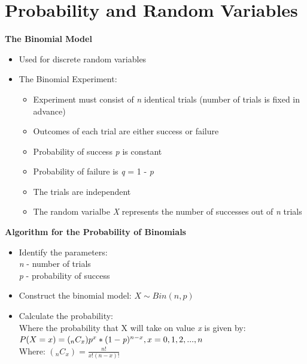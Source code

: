 \documentclass{article}
\begin{document}
\section{Probability and Random Variables}

\textbf{The Binomial Model}
\begin{itemize}
    \item Used for discrete random variables
    \item The Binomial Experiment:
    \begin{itemize}
        \item Experiment must consist of \emph{n} identical trials (number of trials is fixed in advance)
        \item Outcomes of each trial are either success or failure
        \item Probability of success \emph{p} is constant
        \item Probability of failure is \emph{q} = 1 - \emph{p}
        \item The trials are independent
        \item The random varialbe \emph{X} represents the number of successes out of \emph{n} trials 
    \end{itemize}
\end{itemize}

\noindent
\textbf{Algorithm for the Probability of Binomials}
\begin{itemize}
    \item Identify the parameters: \\
    \emph{n} - number of trials \\
    \emph{p} - probability of success
    \item Construct the binomial model: \begin{math}
        X \sim Bin(n , p)    
    \end{math}
    \item Calculate the probability: \\
    Where the probability that X will take on value \emph{x} is given by:\\
    \begin{math} 
        P(X = x) = (_{n}C_{x})p^x * (1-\emph{p})^{n-x}, x = 0, 1, 2, ..., n     
    \end{math} \\
    Where: \begin{math}
        (_{n}C_{x}) = \frac{n!}{x!(n-x)!}
    \end{math}
\end{itemize}
\end{document}
